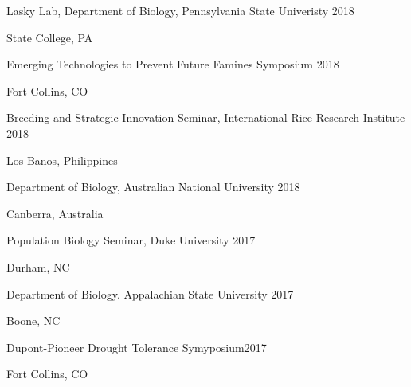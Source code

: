 \documentclass[12pt,english]{article}
\begin{document}
\hspace*{1.0em}Lasky Lab, Department of Biology, Pennsylvania State Univeristy  \hfill 2018 \par
\hspace*{2.0em}State College, PA \par\vspace{0.5ex}

\hspace*{1.0em}Emerging Technologies to Prevent Future Famines Symposium  \hfill 2018 \par
\hspace*{2.0em}Fort Collins, CO \par\vspace{0.5ex}

\hspace*{1.0em}Breeding and Strategic Innovation Seminar, International Rice Research Institute  \hfill 2018 \par
\hspace*{2.0em}Los Banos, Philippines \par\vspace{0.5ex}

\hspace*{1.0em}Department of Biology, Australian National University  \hfill 2018 \par
\hspace*{2.0em}Canberra, Australia \par\vspace{0.5ex}

\hspace*{1.0em}Population Biology Seminar,  Duke University  \hfill 2017 \par
\hspace*{2.0em}Durham, NC \par\vspace{0.5ex}

\hspace*{1.0em}Department of Biology. Appalachian State University  \hfill 2017 \par
\hspace*{2.0em}Boone, NC  \par\vspace{0.5ex}

\hspace*{1.0em}Dupont-Pioneer Drought Tolerance Symyposium\hfill 2017 \par
\hspace*{2.0em}Fort Collins, CO \par\vspace{0.5ex}
\end{document}
